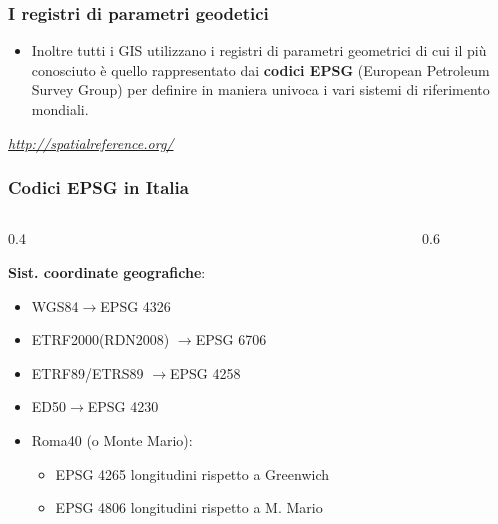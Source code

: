 \documentclass{beamer}
\begin{document}
{\begin{frame}
   \frametitle{I registri di parametri geodetici}
   
    \begin{itemize}


  	\item Inoltre tutti i GIS utilizzano i registri di parametri geometrici di cui il più conosciuto è quello rappresentato dai \textbf{codici EPSG} (European Petroleum Survey Group) per definire in maniera univoca i vari sistemi di riferimento mondiali.
  	
  \end{itemize}	
   
\begin{center}
   \href{http://spatialreference.org/}{\textcolor{gter}{\emph{http://spatialreference.org/}}}
\end{center}

\end{frame}

\begin{frame}
   \frametitle{Codici EPSG in Italia}
  \footnotesize
     \begin{columns}	
		\begin{column} {0.4\textwidth}
    		
   \textbf{Sist. coordinate geografiche}:
   \footnotesize{	
    \begin{itemize}
    	\item WGS84$\rightarrow$EPSG 4326
    	\item ETRF2000(RDN2008) $\rightarrow$EPSG 6706
    	\item ETRF89/ETRS89 $\rightarrow$EPSG 4258
    	\item ED50$\rightarrow$EPSG 4230
    	\item Roma40 (o Monte Mario):
    	\begin{itemize}
    		\item EPSG 4265 \tiny{longitudini rispetto a Greenwich}
    		\item \footnotesize{EPSG 4806} \tiny{longitudini rispetto a M. Mario}
   	 	\end{itemize}  	
  	\end{itemize}
  	}
  	\end{column}
	\begin{column} {0.6\textwidth}
  	

\end{column}
\end{columns}
\end{frame}}
\end{document}
